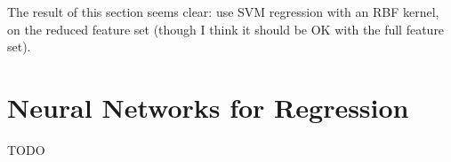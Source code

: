\documentclass[a4paper, 11pt]{article}
\begin{document}
The result of this section seems clear: use SVM regression with an RBF kernel, on the reduced
feature set (though I think it should be OK with the full feature set).




\section{Neural Networks for Regression}

TODO
\end{document}
